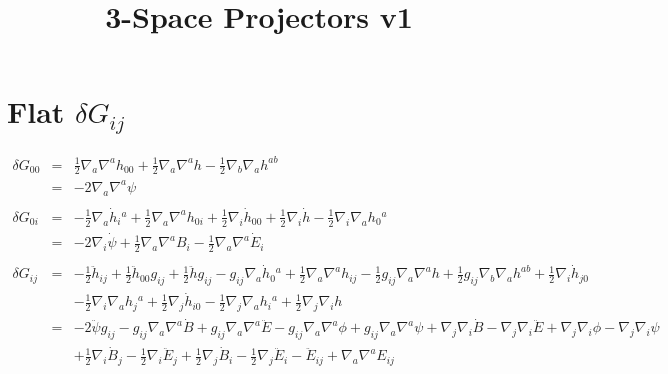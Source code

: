 \documentclass[10pt,letterpaper]{article}
\title{3-Space Projectors v1}
\date{}
\numberwithin{equation}{section}
\begin{document}
 
\maketitle
\noindent 
\section{Flat $\delta G_{ij}$} 
\begin{eqnarray}
\delta G_{00} &=& \tfrac{1}{2} \nabla_{a}\nabla^{a}h_{00} + \tfrac{1}{2} \nabla_{a}\nabla^{a}h -  \tfrac{1}{2} \nabla_{b}\nabla_{a}h^{ab}
\nonumber\\
&=& -2\nabla_a\nabla^a \psi
\nonumber\\ \nonumber\\
\delta G_{0i}&=&- \tfrac{1}{2} \nabla_{a}\dot{h}_{i}{}^{a} + \tfrac{1}{2} \nabla_{a}\nabla^{a}h_{0i} + \tfrac{1}{2} \nabla_{i}\dot{h}_{00} + \tfrac{1}{2} \nabla_{i}\dot{h} -  \tfrac{1}{2} \nabla_{i}\nabla_{a}h_{0}{}^{a}
\nonumber\\
&=& -2\nabla_i \dot \psi + \tfrac12 \nabla_a\nabla^a B_i - \tfrac12 \nabla_a \nabla^a \dot E_i
\nonumber\\ \nonumber\\
\delta G_{ij} &=& - \tfrac{1}{2} \ddot{h}_{ij} + \tfrac{1}{2} \ddot{h}_{00} g_{ij} + \tfrac{1}{2} \ddot{h} g_{ij} -  g_{ij} \nabla_{a}\dot{h}_{0}{}^{a} + \tfrac{1}{2} \nabla_{a}\nabla^{a}h_{ij} -  \tfrac{1}{2} g_{ij} \nabla_{a}\nabla^{a}h + \tfrac{1}{2} g_{ij} \nabla_{b}\nabla_{a}h^{ab} + \tfrac{1}{2} \nabla_{i}\dot{h}_{j0} 
\nonumber\\
&& -  \tfrac{1}{2} \nabla_{i}\nabla_{a}h_{j}{}^{a} + \tfrac{1}{2} \nabla_{j}\dot{h}_{i0} -  \tfrac{1}{2} \nabla_{j}\nabla_{a}h_{i}{}^{a} + \tfrac{1}{2} \nabla_{j}\nabla_{i}h
\nonumber\\
&=& -2 \ddot{\psi} g_{ij} -  g_{ij} \nabla_{a}\nabla^{a}\dot{B} + g_{ij} \nabla_{a}\nabla^{a}\ddot{E} -  g_{ij} \nabla_{a}\nabla^{a}\phi + g_{ij} \nabla_{a}\nabla^{a}\psi + \nabla_{j}\nabla_{i}\dot{B} -  \nabla_{j}\nabla_{i}\ddot{E} + \nabla_{j}\nabla_{i}\phi -  \nabla_{j}\nabla_{i}\psi
\nonumber\\
&&+\tfrac{1}{2} \nabla_{i}\dot{B}_{j} -  \tfrac{1}{2} \nabla_{i}\ddot{E}_{j} + \tfrac{1}{2} \nabla_{j}\dot{B}_{i} -  \tfrac{1}{2} \nabla_{j}\ddot{E}_{i}- \ddot{E}_{ij} + \nabla_{a}\nabla^{a}E_{ij}
\end{eqnarray}

\end{document}
